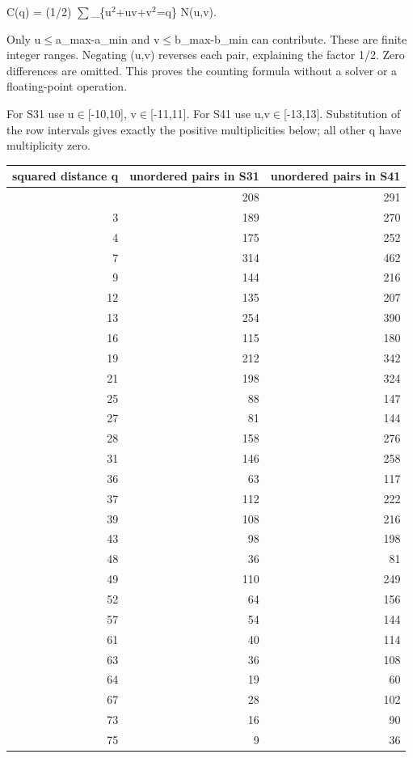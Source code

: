 \documentclass[
]{article}
\begin{document}
C(q) = (1/2) \ensuremath{\sum}\_\{u\ensuremath{{}^2}+uv+v\ensuremath{{}^2}=q\} N(u,v).

Only \textbar u\textbar\ensuremath{\le}a\_max-a\_min and
\textbar v\textbar\ensuremath{\le}b\_max-b\_min can contribute. These are finite
integer ranges. Negating (u,v) reverses each pair, explaining the factor
1/2. Zero differences are omitted. This proves the counting formula
without a solver or a floating-point operation.

For S31 use u\ensuremath{\in}{[}-10,10{]}, v\ensuremath{\in}{[}-11,11{]}. For S41 use
u,v\ensuremath{\in}{[}-13,13{]}. Substitution of the row intervals gives exactly the
positive multiplicities below; all other q have multiplicity zero.

\begin{longtable}[]{@{}rrr@{}}
\toprule\noalign{}
squared distance q & unordered pairs in S31 & unordered pairs in S41 \\
\midrule\noalign{}
\endhead
\bottomrule\noalign{}
\endlastfoot
1 & 208 & 291 \\
3 & 189 & 270 \\
4 & 175 & 252 \\
7 & 314 & 462 \\
9 & 144 & 216 \\
12 & 135 & 207 \\
13 & 254 & 390 \\
16 & 115 & 180 \\
19 & 212 & 342 \\
21 & 198 & 324 \\
25 & 88 & 147 \\
27 & 81 & 144 \\
28 & 158 & 276 \\
31 & 146 & 258 \\
36 & 63 & 117 \\
37 & 112 & 222 \\
39 & 108 & 216 \\
43 & 98 & 198 \\
48 & 36 & 81 \\
49 & 110 & 249 \\
52 & 64 & 156 \\
57 & 54 & 144 \\
61 & 40 & 114 \\
63 & 36 & 108 \\
64 & 19 & 60 \\
67 & 28 & 102 \\
73 & 16 & 90 \\
75 & 9 & 36 \\

\end{longtable}
\end{document}

